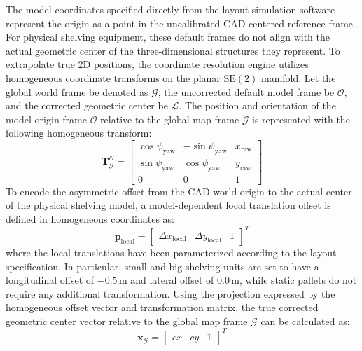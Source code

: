 The model coordinates specified directly from the layout simulation software represent the origin as a point in the uncalibrated CAD-centered reference frame. For physical shelving equipment, these default frames do not align with the actual geometric center of the three-dimensional structures they represent. To extrapolate true 2D positions, the coordinate resolution engine utilizes homogeneous coordinate transforms on the planar $\text{SE}(2)$ manifold. Let the global world frame be denoted as $\mathcal{G}$, the uncorrected default model frame be $\mathcal{O}$, and the corrected geometric center be $\mathcal{L}$. The position and orientation of the model origin frame $\mathcal{O}$ relative to the global map frame $\mathcal{G}$ is represented with the following homogeneous transform:
\begin{equation}
\mathbf{T}_{\mathcal{G}}^{\mathcal{O}} = \begin{bmatrix} \cos\psi_{\text{yaw}} & -\sin\psi_{\text{yaw}} & x_{\text{raw}} \\ \sin\psi_{\text{yaw}} & \cos\psi_{\text{yaw}} & y_{\text{raw}} \\ 0 & 0 & 1 \end{bmatrix} \label{eq:homogeneous_raw_transform}
\end{equation}
To encode the asymmetric offset from the CAD world origin to the actual center of the physical shelving model, a model-dependent local translation offset is defined in homogeneous coordinates as:
\begin{equation}
\mathbf{p}_{\text{local}} = \begin{bmatrix} \Delta x_{\text{local}} & \Delta y_{\text{local}} & 1 \end{bmatrix}^T \label{eq:local_offset_vector}
\end{equation}
where the local translations have been parameterized according to the layout specification. In particular, small and big shelving units are set to have a longitudinal offset of $-0.5\,\text{m}$ and lateral offset of $0.0\,\text{m}$, while static pallets do not require any additional transformation. Using the projection expressed by the homogeneous offset vector and transformation matrix, the true corrected geometric center vector relative to the global map frame $\mathcal{G}$ can be calculated as:
\begin{equation}
\mathbf{x}_{\mathcal{G}} = \begin{bmatrix} cx & cy & 1 \end{bmatrix}^T \label{eq:corrected_center_vector}
\end{equation}
